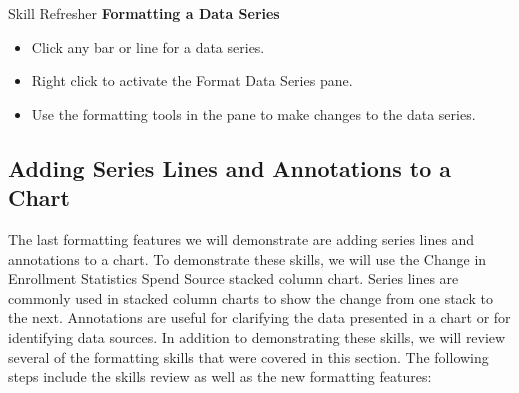 \begin{center}
	\begin{sklbox}{Skill Refresher}
		\textbf{Formatting a Data Series}
		\\
		\begin{itemize}
			\setlength{\itemsep}{0pt}
			\setlength{\parskip}{0pt}
			\setlength{\parsep}{0pt}
			
			\item Click any bar or line for a data series.
			\item Right click to activate the Format Data Series pane.
			\item Use the formatting tools in the pane to make changes to the data series.
			
		\end{itemize}
	\end{sklbox}
\end{center}
\subsection{Adding Series Lines and Annotations to a Chart}

The last formatting features we will demonstrate are adding series lines and annotations to a chart.
To demonstrate these skills, we will use the Change in Enrollment Statistics Spend Source stacked
column chart. Series lines are commonly used in stacked column charts to show the change from one
stack to the next. Annotations are useful for clarifying the data presented in a chart or for identifying
data sources. In addition to demonstrating these skills, we will review several of the formatting skills
that were covered in this section. The following steps include the skills review as well as the new
formatting features:

